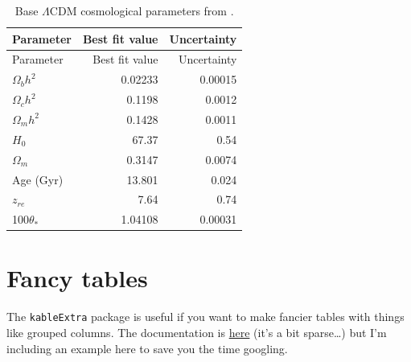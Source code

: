 \documentclass[
]{book}
\begin{document}
\begin{longtable}[]{@{}lrr@{}}
\caption{\label{tab:planck-model} Base \(\Lambda\)CDM cosmological parameters from \citet{Planck18}.}\tabularnewline
\toprule\noalign{}
Parameter & Best fit value & Uncertainty \\
\midrule\noalign{}
\endfirsthead
\toprule\noalign{}
Parameter & Best fit value & Uncertainty \\
\midrule\noalign{}
\endhead
\bottomrule\noalign{}
\endlastfoot
\(\Omega_{b}h^2\) & 0.02233 & 0.00015 \\
\(\Omega_{c}h^2\) & 0.1198 & 0.0012 \\
\(\Omega_{m}h^2\) & 0.1428 & 0.0011 \\
\(H_0\) & 67.37 & 0.54 \\
\(\Omega_{m}\) & 0.3147 & 0.0074 \\
Age (Gyr) & 13.801 & 0.024 \\
\(z_{re}\) & 7.64 & 0.74 \\
100\(\theta_{*}\) & 1.04108 & 0.00031 \\
\end{longtable}

\section{Fancy tables}\label{sec:fancy-tables}

The \texttt{kableExtra} package is useful if you want to make fancier tables with things like grouped columns. The documentation is \href{https://haozhu233.github.io/kableExtra/bookdown/index.html}{here} (it's a bit sparse\ldots) but I'm including an example here to save you the time googling.
\end{document}
